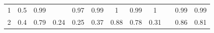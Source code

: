 \documentclass[twoside,11pt]{article}
\begin{document}
\begin{table}[H]
{\begin{tabular}{ccccccccclcc}
\multicolumn{1}{|c|}{1}                                                                           & \multicolumn{1}{c|}{0.5}                                                            & \multicolumn{1}{c|}{0.99}                                                                      & \multicolumn{1}{c|}{\cellcolor[HTML]{FFCCC9}{\color[HTML]{333333} 1}}                    & \multicolumn{1}{c|}{0.97}                                                                & \multicolumn{1}{c|}{\cellcolor[HTML]{ECF4FF}0.99}                                        & \multicolumn{1}{c|}{\cellcolor[HTML]{FFCCC9}1}                                              & \multicolumn{1}{c|}{\cellcolor[HTML]{ECF4FF}0.99}                                           & \multicolumn{1}{c|}{\cellcolor[HTML]{FFCCC9}1}                                              & \multicolumn{1}{l|}{}                    & \multicolumn{1}{c|}{0.99}                                                                      & \multicolumn{1}{c|}{0.99}                                                                      \\ \cline{1-1}
\multicolumn{1}{|c|}{2}                                                                           & \multicolumn{1}{c|}{0.4}                                                            & \multicolumn{1}{c|}{\cellcolor[HTML]{ECF4FF}0.79}                                              & \multicolumn{1}{c|}{0.24}                                                                & \multicolumn{1}{c|}{0.25}                                                                & \multicolumn{1}{c|}{0.37}                                                                & \multicolumn{1}{c|}{\cellcolor[HTML]{FFCCC9}0.88}                                           & \multicolumn{1}{c|}{\cellcolor[HTML]{FFFFFF}0.78}                                           & \multicolumn{1}{c|}{0.31}                                                                   & \multicolumn{1}{l|}{}                    & \multicolumn{1}{c|}{0.86}                                                                      & \multicolumn{1}{c|}{0.81}                                                                      \\ \cline{1-1}

\end{tabular}}
\end{table}
\end{document}
